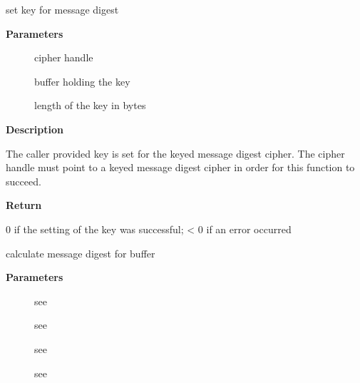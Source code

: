 \documentclass[a4paper,8pt,english]{sphinxmanual}
\begin{document}
\begin{fulllineitems}
\label{crypto/api-digest:c.crypto_shash_setkey}
set key for message digest

\end{fulllineitems}


\textbf{Parameters}
\begin{description}
\item[{}] \leavevmode
cipher handle

\item[{}] \leavevmode
buffer holding the key

\item[{}] \leavevmode
length of the key in bytes

\end{description}

\textbf{Description}

The caller provided key is set for the keyed message digest cipher. The
cipher handle must point to a keyed message digest cipher in order for this
function to succeed.

\textbf{Return}

0 if the setting of the key was successful; \textless{} 0 if an error occurred

\begin{fulllineitems}
\label{crypto/api-digest:c.crypto_shash_digest}
calculate message digest for buffer

\end{fulllineitems}


\textbf{Parameters}
\begin{description}
\item[{}] \leavevmode
see {\hyperref[crypto/api\string-digest:c.crypto_shash_final]{\emph{}}}

\item[{}] \leavevmode
see {\hyperref[crypto/api\string-digest:c.crypto_shash_update]{\emph{}}}

\item[{}] \leavevmode
see {\hyperref[crypto/api\string-digest:c.crypto_shash_update]{\emph{}}}

\item[{}] \leavevmode
see {\hyperref[crypto/api\string-digest:c.crypto_shash_final]{\emph{}}}

\end{description}
\end{document}
